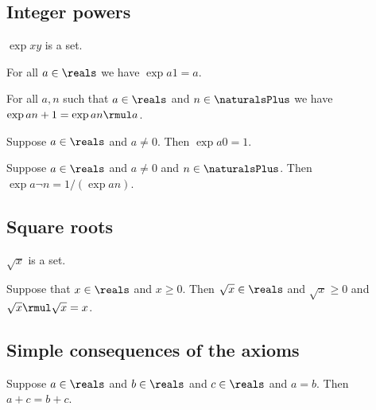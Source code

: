 \subsection{Integer powers}

\begin{signature} \label{sig7}
    $\exp{x}{y}$ is a set.
\end{signature}

\begin{axiom}\label{real_pow_one}
    For all $a\in\reals$ we have $\exp{a}{1} = a$.
\end{axiom}

\begin{axiom}\label{real_pow_succ}
    For all $a, n$ such that $a\in\reals$ and $n\in\naturalsPlus$ we have $\exp{a}{n+1} = \exp{a}{n} \rmul a$.
\end{axiom}

\begin{axiom}\label{real_pow_zero}
    Suppose $a\in\reals$ and $a\neq 0$.
    Then $\exp{a}{0} = 1$.
\end{axiom}

\begin{axiom}\label{real_pow_neg}
    Suppose $a\in\reals$ and $a\neq 0$ and $n\in\naturalsPlus$.
    Then $\exp{a}{\neg{n}} = 1 / (\exp{a}{n})$. 
\end{axiom}

\subsection{Square roots}

\begin{signature} \label{sig9}
    $\sqrt{x}$ is a set.
\end{signature}

\begin{axiom} \label{positive_square_root}
    Suppose that $x \in\reals$ and $x \geq 0$.
    Then $\sqrt{x} \in \reals$ and $\sqrt{x} \geq 0$ and $\sqrt{x} \rmul \sqrt{x} = x$.
\end{axiom}    

\subsection{Simple consequences of the axioms}

\begin{proposition}\label{real_add_eq_subst}
    Suppose $a\in\reals$ and $b\in\reals$ and $c\in\reals$ and $a = b$.
    Then $a + c = b + c$.
\end{proposition}

